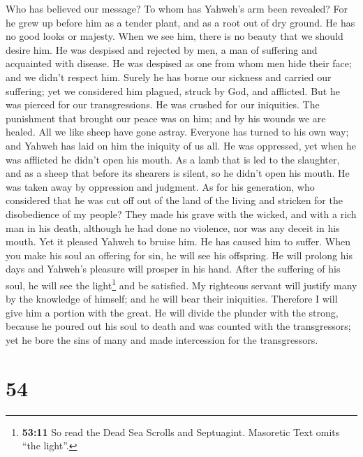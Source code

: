 Who has believed our message? To whom has Yahweh's arm
been revealed?  For he grew up before him as a tender
plant, and as a root out of dry ground. He has no good looks or majesty.
When we see him, there is no beauty that we should desire him.
 He was despised and rejected by men, a man of suffering
and acquainted with disease. He was despised as one from whom men hide
their face; and we didn't respect him.  Surely he has
borne our sickness and carried our suffering; yet we considered him
plagued, struck by God, and afflicted.  But he was pierced
for our transgressions. He was crushed for our iniquities. The
punishment that brought our peace was on him; and by his wounds we are
healed.  All we like sheep have gone astray. Everyone has
turned to his own way; and Yahweh has laid on him the iniquity of us
all.  He was oppressed, yet when he was afflicted he
didn't open his mouth. As a lamb that is led to the slaughter, and as a
sheep that before its shearers is silent, so he didn't open his mouth.
 He was taken away by oppression and judgment. As for his
generation, who considered that he was cut off out of the land of the
living and stricken for the disobedience of my people? 
They made his grave with the wicked, and with a rich man in his death,
although he had done no violence, nor was any deceit in his mouth.
 Yet it pleased Yahweh to bruise him. He has caused him
to suffer. When you make his soul an offering for sin, he will see his
offspring. He will prolong his days and Yahweh's pleasure will prosper
in his hand.  After the suffering of his soul, he will
see the light\footnote{\textbf{53:11} So read the Dead Sea Scrolls and
  Septuagint. Masoretic Text omits ``the light''.} and be satisfied. My
righteous servant will justify many by the knowledge of himself; and he
will bear their iniquities.  Therefore I will give him a
portion with the great. He will divide the plunder with the strong,
because he poured out his soul to death and was counted with the
transgressors; yet he bore the sins of many and made intercession for
the transgressors.

\hypertarget{section-51}{%
\section{54}\label{section-51}}

